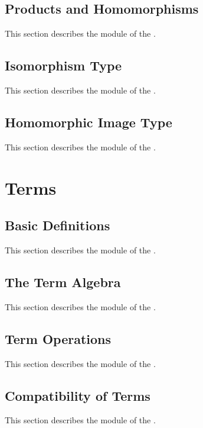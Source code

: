 \documentclass[a4paper,UKenglish,cleveref, autoref, thm-restate]{lipics-v2021}
\begin{document}
\subsection{Products and Homomorphisms}
\label{sec:products-1}
This section describes the \ualibHomProducts module of the \agdaualib.


\subsection{Isomorphism Type}
\label{sec:isomorphisms}
This section describes the \ualibIsomorphisms module of the \agdaualib.


\subsection{Homomorphic Image Type}
\label{sec:homomorphicimages}
This section describes the \ualibHomImages module of the \agdaualib.


\newpage

\section{Terms}

\subsection{Basic Definitions}
\label{sec:terms-basic-definitions}
This section describes the \ualibTermsBasic module of the \agdaualib.


\subsection{The Term Algebra}
\label{sec:the-term-algebra}
This section describes the \ualibTermsFree module of the \agdaualib.


\subsection{Term Operations}
\label{sec:term-operations}
This section describes the \ualibTermsOperations module of the \agdaualib.


\subsection{Compatibility of Terms}
\label{sec:compatibility-of-terms}
This section describes the \ualibTermsCompatibility module of the \agdaualib.

\end{document}
